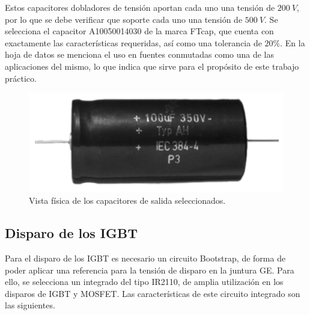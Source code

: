 Estos capacitores dobladores de tensión aportan cada uno una tensión de $200 \ V$, por lo que se debe verificar que soporte cada uno una tensión de $500 \ V$. Se selecciona el capacitor A10050014030 de la marca FTcap, que cuenta con exactamente las características  requeridas, así como una tolerancia de $20\%$. En la hoja de datos se menciona el uso en fuentes conmutadas como una de las aplicaciones del mismo, lo que indica que sirve para el propósito de este trabajo práctico. 

\begin{figure}
	\centering
	\includegraphics[width=0.3\linewidth]{img/capa_salida}
	\caption{Vista física de los capacitores de salida seleccionados.}
	\label{fig:capasalida}
\end{figure}


\subsection{Disparo de los IGBT}

Para el disparo de los IGBT es necesario un circuito Bootstrap, de forma de poder aplicar una referencia para la tensión de disparo en la juntura GE. Para ello, se selecciona un integrado del tipo IR2110, de amplia utilización en los disparos de IGBT y MOSFET. Las características de este circuito integrado son las siguientes.

